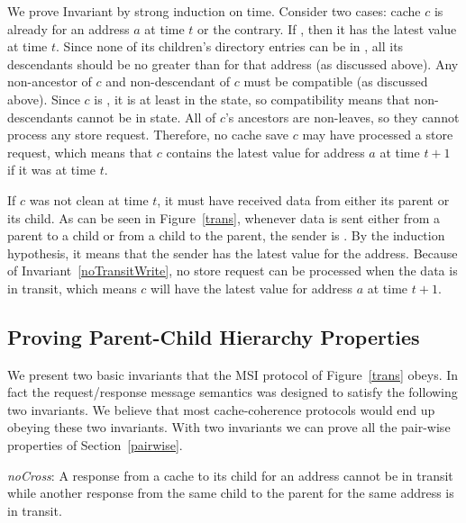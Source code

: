 We prove Invariant  by strong induction on
time. Consider two cases: cache $c$ is already \clean{} for an address
$a$ at time $t$ or the contrary.  If \clean{}, then it has the latest
value at time $t$. Since none of its children's directory entries can
be in \Mo{}, all its descendants should be no greater than \Sh{} for
that address (as discussed above). Any non-ancestor of $c$ and
non-descendant of $c$ must be compatible (as discussed above). Since
$c$ is \clean, it is at least in the \Sh{} state, so compatibility
means that non-descendants cannot be in \Mo{} state. All of $c$'s
ancestors are non-leaves, so they cannot process any store
request. Therefore, no cache save $c$ may have processed a store
request, which means that $c$ contains the latest value for address
$a$ at time $t+1$ if it was \clean{} at time $t$.

If $c$ was not clean at time $t$, it must have received data from
either its parent or its child.  As can be seen in Figure~\ref{trans},
whenever data is sent either from a parent to a child or from a child
to the parent, the sender is \clean. By the induction hypothesis, it
means that the sender has the latest value for the address. Because of
Invariant~\ref{noTransitWrite}, no store request can be processed when
the data is in transit, which means $c$ will have the latest value for
address $a$ at time $t+1$.

\subsection{Proving Parent-Child Hierarchy Properties}



We present two basic invariants that the MSI protocol of Figure~\ref{trans}
obeys. In fact the request/response message semantics was designed to satisfy
the following two invariants. We believe that most cache-coherence protocols
would end up obeying these two invariants. With two invariants we can
prove all the pair-wise properties of Section~\ref{pairwise}.

\begin{inv}
\textit{noCross}: A response from a cache to its child for an address cannot
be in transit while another response from the same child to the parent for the
same address is in transit.
\label{noCross}
\end{inv}

